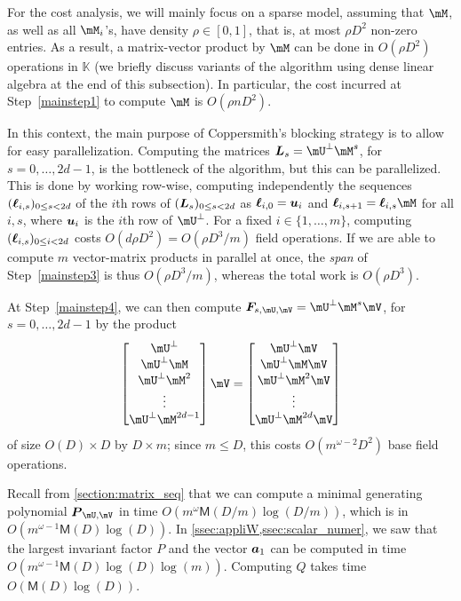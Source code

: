\documentclass[12pt]{article}
\newcommand{\mat}[1]{\bm{\MakeUppercase{#1}}} %
\newcommand{\row}[1]{\bm{\MakeLowercase{#1}}} %
\newcommand{\seqelt}[1]{\bm{F}_{#1}} %
\newcommand{\sqfree}{Q}
\newcommand{\density}{\rho}
\def\M {\ensuremath{\mathsf{M}}}
\def\K{\mathbb{K}}
\def\K {\ensuremath{\mathbb{K}}}
\begin{document}
For the cost analysis, we will mainly focus on a sparse model,
assuming that $\mM$, as well as all $\mM_i$'s, have density $\density
\in [0,1]$, that is, at most $\density D^2$ non-zero entries.  As a
result, a matrix-vector product by $\mM$ can be done in $O(\density
D^2)$ operations in $\K$ (we briefly discuss variants of the algorithm
using dense linear algebra at the end of this subsection). In
particular, the cost incurred at Step~\ref{mainstep1} to compute $\mM$
is $O(\density n D^2)$.

In this context, the main purpose of Coppersmith's blocking strategy
is to allow for easy parallelization. Computing the matrices
$\mat{L}_s=\mU^{\perp}\mM^s$, for $s=0,\dots,2d-1$, is the bottleneck
of the algorithm, but this can be parallelized. This is done by
working row-wise, computing independently the sequences
$(\row{\ell}_{i,s})_{0 \le s < 2d}$ of the $i$th rows of
$(\mat{L}_s)_{0 \le s < 2d}$ as $\row{\ell}_{i,0}=\row{u}_i$ and
 $\row{\ell}_{i,s+1} = \row{\ell}_{i,s}
\mM$ for all $i,s$, where $\row{u}_i$ is the $i$th row of $\mU^\perp$.
For a fixed $i \in \{1,\dots,m\}$, computing $(\mat{\ell}_{i,s})_{0
  \le i < 2d}$ costs $O(d \density D^2) = O(\density D^3/m )$ field operations. If
we are able to compute $m$ vector-matrix products in parallel at once,
the {\em span} of Step~\ref{mainstep3} is thus $O(\density D^3/m)$, whereas
the total work is $O(\density D^3)$.

At Step~\ref{mainstep4}, we can then compute $\seqelt{s,\mU,\mV}=\mU^{\perp}\mM^s\mV$, for $s=0,\dots,2d-1$ by the
product
$$
\begin{bmatrix}
\mU^{\perp}\\
\mU^{\perp} \mM\\
\mU^{\perp} \mM^2\\
\vdots\\
\mU^{\perp} \mM^{2d-1}\\
\end{bmatrix} \mV
= 
\begin{bmatrix}
\mU^{\perp} \mV\\
\mU^{\perp} \mM \mV\\
\mU^{\perp} \mM^2 \mV\\
\vdots \\
\mU^{\perp} \mM^{2d} \mV\\
\end{bmatrix}
$$
of size $O(D) \times D$ by $D \times m$; since $m \le D$, this  costs $O(m^{\omega-2}D^2)$
base field operations.

Recall from \cref{section:matrix_seq} that we can compute a minimal
generating polynomial $\mat{P}_{\mU,\mV}$ in time $O(m^{\omega}
\M(D/m) \log(D/m))$, which is in $O(m^{\omega-1} \M(D) \log(D))$.  In
\cref{ssec:appliW,ssec:scalar_numer}, we saw that the
largest invariant factor $P$ and the vector $\row{a}_1$ can be
computed in time $O(m^{\omega-1} \M(D) \log(D) \log(m))$.  Computing $\sqfree$
takes time $O(\M(D) \log(D))$.
\end{document}
